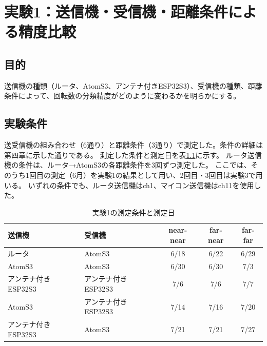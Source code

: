 \documentclass[uplatex, 12pt]{ujbook}
\begin{document}
\chapter{実験1：送信機・受信機・距離条件による精度比較}
\section{目的}
送信機の種類（ルータ、AtomS3、アンテナ付きESP32S3）、受信機の種類、距離条件によって、回転数の分類精度がどのように変わるかを明らかにする。

\section{実験条件}
送受信機の組み合わせ（6通り）と距離条件（3通り）で測定した。条件の詳細は第四章に示した通りである。
測定した条件と測定日を表\ref{tab:exp1}に示す。
ルータ送信機の条件は、ルータ→AtomS3の各距離条件を3回ずつ測定した。
ここでは、そのうち1回目の測定（6月）を実験1の結果として用い、2回目・3回目は実験3で用いる。
いずれの条件でも、ルータ送信機はch1、マイコン送信機はch11を使用した。

\begin{table}[htbp]
  \centering
  \caption{実験1の測定条件と測定日}
  \label{tab:exp1}
  \begin{tabular}{l l c c c}
    \toprule
    送信機 & 受信機 & near-near & far-near & far-far \\
    \midrule
    ルータ & AtomS3 & 6/18 & 6/22 & 6/29 \\
    AtomS3 & AtomS3 & 6/30 & 6/30 & 7/3 \\
    アンテナ付きESP32S3 & アンテナ付きESP32S3 & 7/6 & 7/6 & 7/7 \\
    AtomS3 & アンテナ付きESP32S3 & 7/14 & 7/16 & 7/20 \\
    アンテナ付きESP32S3 & AtomS3 & 7/21 & 7/21 & 7/27 \\
    \bottomrule
  \end{tabular}
\end{table}
\end{document}
